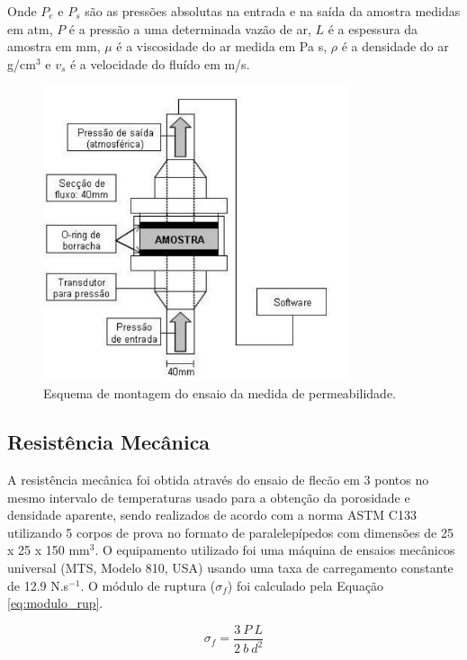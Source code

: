     Onde $P_e$ e $P_s$ são as pressões absolutas na entrada e na saída da
    amostra medidas em atm, $P$ é a pressão a uma determinada vazão de ar, $L$ é a
    espessura da amostra em mm, $\mu$ é a viscosidade do ar medida em Pa s,
    $\rho$ é a densidade do ar g/cm$^3$ e $v_s$ é a velocidade do fluído em
    m/s.

    
    
  \begin{figure}[ht]
	\centering
	\includegraphics[width=9cm]{./figures/perm.pdf}
	\caption{Esquema de montagem do ensaio da medida de permeabilidade.  \label{fig:perm}}
  \end{figure}

   

    \subsection{Resistência Mecânica}\label{mat:rm}
    A resistência mecânica foi obtida através do ensaio de flecão em 3 pontos no
    mesmo intervalo de temperaturas usado para a obtenção da porosidade e
    densidade aparente, sendo realizados de acordo com a norma ASTM C133
    utilizando 5 corpos de prova no formato de paralelepípedos com dimensões de
    25 x 25 x 150 mm$^3$. O equipamento utilizado foi uma máquina de ensaios
    mecânicos universal (MTS, Modelo 810, USA) usando uma taxa de carregamento
    constante de 12.9 N.s$^{-1}$. O módulo de ruptura ($\sigma_f$) foi calculado
    pela Equação \ref{eq:modulo_rup}.

    \begin{equation}
      \label{eq:modulo_rup}
     \sigma_f = \frac{3 \ P \ L}{2 \ b \ d^2}
    \end{equation}

